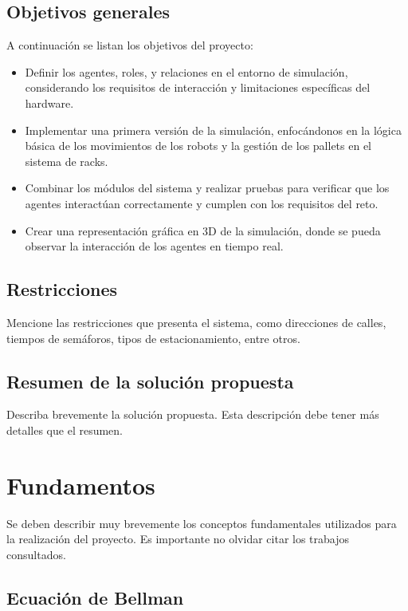 \documentclass[sjournal]{IEEEtran}
\begin{document}
\subsection{Objetivos generales}
A continuación se listan los objetivos del proyecto:
\begin{itemize}
    \item Definir los agentes, roles, y relaciones en el entorno de simulación, considerando los requisitos de interacción y limitaciones específicas del hardware.
    \item Implementar una primera versión de la simulación, enfocándonos en la lógica básica de los movimientos de los robots y la gestión de los pallets en el sistema de racks.
    \item Combinar los módulos del sistema y realizar pruebas para verificar que los agentes interactúan correctamente y cumplen con los requisitos del reto.
    \item Crear una representación gráfica en 3D de la simulación, donde se pueda observar la interacción de los agentes en tiempo real.
    
\end{itemize}

\subsection{Restricciones}
Mencione las restricciones que presenta el sistema, como direcciones de calles, tiempos de semáforos, tipos de estacionamiento, entre otros.

\subsection{Resumen de la solución propuesta}
Describa brevemente la solución propuesta. Esta descripción debe tener más detalles que el resumen.

\section{Fundamentos}

\noindent
Se deben describir muy brevemente los conceptos fundamentales utilizados para la realización del proyecto. Es importante no olvidar citar los trabajos consultados.

\subsection{Ecuación de Bellman}
\end{document}
